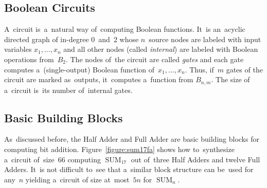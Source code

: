 \documentclass[sigconf, review, anonymous]{acmart}
\DeclareMathOperator{\SUM}{SUM}
\begin{document}
\subsection{Boolean Circuits}
A~circuit is~a~natural way of~computing Boolean functions.
It~is an~acyclic directed graph of in-degree $0$~and~$2$ whose $n$~source
nodes are labeled with input variables
$x_1, \dotsc, x_n$ and all other nodes (called \emph{internal})
are labeled with Boolean operations from~$B_2$.
The nodes of~the circuit are called \emph{gates} and each gate computes
a~(single-output) Boolean function of~$x_1, \dotsc, x_n$. Thus, if~$m$ gates of the
circuit are marked as~outputs, it~computes a~function from $B_{n,m}$.
The size of a~circuit is~its number of~internal gates.

\subsection{Basic Building Blocks}
As~discussed before, the Half Adder and Full Adder are basic building
blocks for computing bit addition. Figure~\ref{figure:sum17fa}
shows how to~synthesize a~circuit of~size~$66$ computing $\SUM_{17}$
out of~three Half Adders and twelve Full Adders.
It~is not difficult to~see that a~similar block structure can
be~used for any~$n$ yielding a~circuit of size at~most~$5n$ for $\SUM_n$.
\end{document}
